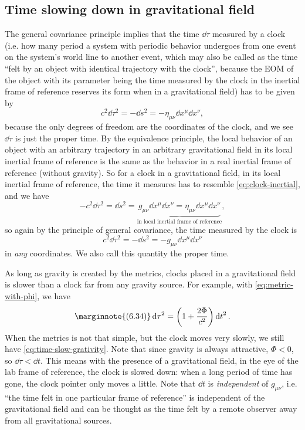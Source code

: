 \documentclass[hyperref, a4paper]{article}
\begin{document}
\subsection{Time slowing down in gravitational field}

The general covariance principle implies that the time $\dd \tau$ measured by a 
clock (i.e. how many period a system with periodic behavior undergoes from one event on the system's world 
line to another event, which may also be called as the time ``felt by an object with identical trajectory 
with the clock'', because the EOM of the object with its parameter being the time measured by the clock in 
the inertial frame of reference reserves its form when in a gravitational field) has to be given by 
\begin{equation}
    c^2 \dd{\tau}^2 = - \dd{s^2} = - \eta_{\mu \nu} \dd{x^\mu} \dd{x^\nu},
    \label{eq:clock-inertial}
\end{equation}
because the only degrees of freedom are the coordinates of the clock, and we see $\dd{\tau}$ is just the proper time. 
By the equivalence principle, the local behavior of an object with an arbitrary trajectory in an arbitrary
gravitational field in its local inertial frame of reference is the same as the behavior in a real inertial 
frame of reference (without gravity). So for a clock in a gravitational field, in its local inertial frame 
of reference, the time it measures has to resemble \eqref{eq:clock-inertial}, and we have 
\[
    - c^2 \dd{\tau^2} = \dd{s^2} = \underbrace{g_{\mu \nu} \dd{x^\mu} \dd{x^\nu} = \eta_{\mu \nu} \dd{x^\mu} \dd{x^\nu} }_{\text{in local inertial frame of reference}},
\]
so again by the principle of general covariance, the time measured by the clock is 
\begin{equation}
    c^2 \dd{\tau^2} = - \dd{s^2} = - g_{\mu \nu} \dd{x^\mu} \dd{x^\nu}
\end{equation}
in \emph{any} coordinates. We also call this quantity the proper time.

As long as gravity is created by the metrics, clocks placed in a gravitational field is slower than a clock 
far from any gravity source. For example, with \eqref{eq:metric-with-phi}, we have 
\begin{equation} \marginnote{(6.34)}
    \dd{\tau}^2 = \left(1 + \frac{2 \Phi}{c^2} \right) \dd{t}^2. \label{eq:time-slow-grativity}
\end{equation} 
When the metrics is not that simple, but the clock moves very slowly, we still have \eqref{eq:time-slow-grativity}.
Note that since gravity is always attractive, $\Phi < 0$, so $\dd{\tau} < \dd{t}$. This means with the 
presence of a gravitational field, in the eye of the lab frame of reference, the clock is slowed down:
when a long period of time has gone, the clock pointer only moves a little.
Note that $\dd{t}$ is \emph{independent} of $g_{\mu \nu}$, i.e. ``the time felt in one particular frame of reference''
is independent of the gravitational field and can be thought as the time felt by a remote observer away from 
all gravitational sources.
\end{document}
